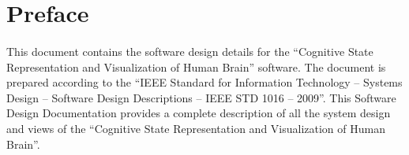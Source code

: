 	\section*{Preface}
	\paragraph{}
    \normalsize
This document contains the software design details for the “Cognitive State Representation and Visualization of Human Brain” software. The document is prepared according to the “IEEE Standard for Information Technology – Systems Design – Software Design Descriptions – IEEE STD 1016 – 2009”. This Software Design Documentation provides a complete description of all the system design and views of the “Cognitive State Representation and Visualization of Human Brain”.